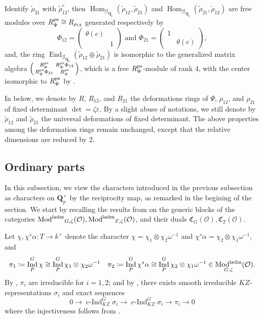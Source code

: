 \documentclass[leqno]{amsart}
\newcommand{\smat}[1]{\left( \begin{smallmatrix} #1 \end{smallmatrix} \right)}
\newcommand{\Gp}{\mathcal{G}_{\Qp}} %
\DeclareMathOperator{\laMod}{\textnormal{Mod}^\textnormal{ladm}}
\newcommand{\ps}{\textnormal{ps}}
\newcommand{\Qp}{\mathbf{Q}_p}
\newcommand{\oo}{\mathcal O}
\newcommand{\1}{\mathbf{1}}
\newcommand{\fC}{\mathfrak C}
\DeclareMathOperator{\End}{End}
\DeclareMathOperator{\Hom}{Hom}
\DeclareMathOperator{\Ind}{Ind}
\DeclareMathOperator{\cInd}{c-Ind}
\theoremstyle{definition}
\theoremstyle{remark}
\begin{document}
Identify $\tilde{\rho}_{21}$ with $\tilde{\rho}_{12}^c$,
then
$\Hom_{\Gp}(\tilde{\rho}_{12}, \tilde{\rho}_{21})$ and
$\Hom_{\Gp}(\tilde{\rho}_{21}, \tilde{\rho}_{12})$
are free modules over $R_{\Psi}^{\ps}\cong R_{\rho_{12}}$ 
generated respectively by
\begin{equation}\label{eq:Phi_ij}
	\Phi_{12}=\smat{\theta(c)&\\&1} \text{ and }
	\Phi_{21}=\smat{1&\\&\theta(c)},
\end{equation}
and, the ring $\End_{\Gp}(\tilde{\rho}_{12}\oplus \tilde{\rho}_{21})$
is isomorphic to the generalized matrix algebra
$\smat{R_{\Psi}^{\ps}& R_{\Psi}^{\ps}\Phi_{12}\\ R_{\Psi}^{\ps}\Phi_{21}& R_{\Psi}^{\ps}}$,
which is a free $R_{\Psi}^{\ps}$-module of rank  $4$,
with the center isomorphic to  $R_{\Psi}^{\ps}$
by \cite[Prop B.26]{pask}.

In below, we denote by 
$R$,  $R_{12}$, and $R_{21}$
the deformations rings of 
$\Psi$,  $\rho_{12}$, and $\rho_{21}$
of fixed determinant $\det=\zeta\varepsilon$.
By a slight abuse of notations,
we still denote by $\tilde{\rho}_{12}$
and $\tilde{\rho}_{21}$ the universal deformations
of fixed determinant.
The above properties among the deformation rings
remain unchanged,
except that the relative dimensions are reduced by $2$.

\subsection{Ordinary parts}

In this subsection,
we view the characters introduced 
in the previous subsection as characters
on $\Qp^\times$ by the reciprocity map,
as remarked in the begining of the section.
We start by recalling the results from
\cite[\S 7 \S 8]{pask}
on the generic blocks of the categories
$\laMod_{G,\zeta}(\oo), \laMod_{T,\zeta}(\oo)$,
and their duals $\fC_G(\oo), \fC_T(\oo)$.

Let $\chi, \chi^s\alpha\colon T\to k^\times$
denote the character  
$\chi=\chi_1\otimes\chi_2\omega^{-1}$
and  $\chi^s\alpha=\chi_2\otimes \chi_1\omega^{-1}$, and
\[
\pi_1\coloneqq \Ind_{P}^G\chi\cong
\Ind_{P}^G\chi_1\otimes\chi_2\omega^{-1}\quad
\pi_2\coloneqq \Ind_{P}^G\chi^s\alpha\cong 
\Ind_{P}^G\chi_2\otimes\chi_1\omega^{-1} \in \laMod_{G,\zeta}(\oo).
\]
By \cite[Thm 30]{barthel},
$\pi_i$ are irreducible for  $i=1,2$;
and by \cite[Thm 33]{barthel}, there exists
smooth irreducible $KZ$-representations $\sigma_i$
and exact sequences
\begin{equation}
	0\to \cInd_{KZ}^G\sigma_i\to
	\cInd_{KZ}^G\sigma_i\to \pi_i\to 0
\end{equation}
where the injectiveness follows from \cite[Thm 19]{barthel}.
\end{document}
